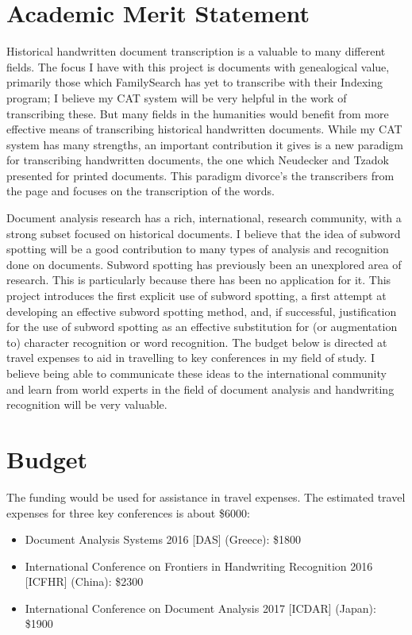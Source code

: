 \documentclass[conference]{IEEEtran}
\begin{document}
{\begin{itemize}
\end{itemize}


\newpage
\section{Academic Merit Statement}
Historical handwritten document transcription is a valuable to many different fields. The focus I have with this project is documents with genealogical value, primarily those which FamilySearch has yet to transcribe with their Indexing program; I believe my CAT system will be very helpful in the work of transcribing these. But many fields in the humanities would benefit from more effective means of transcribing historical handwritten documents. While my CAT system has many strengths, an important contribution it gives is a new paradigm for transcribing handwritten documents, the one which Neudecker and Tzadok\cite{Neudecker2010} presented for printed documents. This paradigm divorce's the transcribers from the page and focuses on the transcription of the words.

Document analysis research has a rich, international, research community, with a strong subset focused on historical documents. I believe that the idea of subword spotting will be a good contribution to many types of analysis and recognition done on documents.
Subword spotting has previously been an unexplored area of research. This is particularly because there has been no application for it. This project introduces the first explicit use of subword spotting, a first attempt at developing an effective subword spotting method, and, if successful, justification for the use of subword spotting as an effective substitution for (or augmentation to) character recognition or word recognition. The budget below is directed at travel expenses to aid in travelling to key conferences in my field of study. I believe being able to communicate these ideas to the international community and learn from world experts in the field of document analysis and handwriting recognition will be very valuable.



\newpage
\section{Budget}
The funding would be used for assistance in travel expenses. The estimated travel expenses for three key conferences is about \$6000:\\
\begin{itemize}
\item Document Analysis Systems 2016 [DAS] (Greece): \$1800
\item International Conference on Frontiers in Handwriting Recognition 2016 [ICFHR] (China): \$2300
\item International Conference on Document Analysis 2017 [ICDAR] (Japan): \$1900
\end{itemize}
}%
%
%


\end{document}
